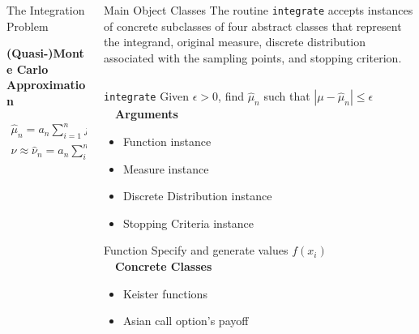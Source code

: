 \documentclass[final]{beamer}
\newcommand{\bfCenter}[1]{\centerline{\textbf{#1}}}
\newlength{\onecolwid}
\newlength{\twocolwid}
\newlength{\threecolwid}
\newcommand{\dif}{\mathrm{d}}
\begin{document}
\begin{frame}[t]
\begin{columns}[t]
\begin{column}{\threecolwid}
\begin{columns}[t,totalwidth=\threecolwid]
\begin{column}{\onecolwid}
\begin{block}{The Integration Problem}
        
    \vspace{2ex}
    \bfCenter{(Quasi-)Monte Carlo Approximation}
        \begin{gather*}
            \hat{\mu}_n = a_n \sum_{i=1}^{n} f(x_i)w_i =  \int_{X} f(x) \, \hat{\nu}( \dif x)
            \label{qmcApprox}
	\\ \nu  \approx \hat{\nu}_n = a_n \sum_{i=1}^n w_i \delta_{x_i}(\cdot) 
            \text{ is discrete probability measure}
        \end{gather*}
\end{block}
\end{column}


\begin{column}{\twocolwid}\vspace{-1in}
\begin{block}{Main Object Classes}
The routine \texttt{integrate} accepts instances of concrete subclasses of four abstract  classes that  represent the integrand,
original measure, discrete distribution associated with the sampling points, and stopping criterion.
\begin{column}{\onecolwid}  \vspace{-2ex}
\begin{alertblock}{\texttt{integrate}}
    Given $\epsilon>0$, find $\hat{\mu}_n$ such that $\left | \mu - \hat{\mu}_n \right  | \leq \epsilon$ \\[1ex]~\
    \textbf{Arguments}
    \begin{itemize}
        \item Function instance
        \item Measure instance
        \item Discrete Distribution instance
        \item Stopping Criteria instance
    \end{itemize}
\end{alertblock}

\vspace{-.1in}
\begin{alertblock}{Function}
    Specify and generate values $f(x_i)$ \\[1ex]~\
    \textbf{Concrete Classes}
    \begin{itemize}
        \item Keister functions \cite{keister1996multidimensional}
        \item Asian call option's payoff 
    \end{itemize}
\end{alertblock}


\end{column}
\end{block}
\end{column}
\end{columns}
\end{column}
\end{columns}
\end{frame}
\end{document}

